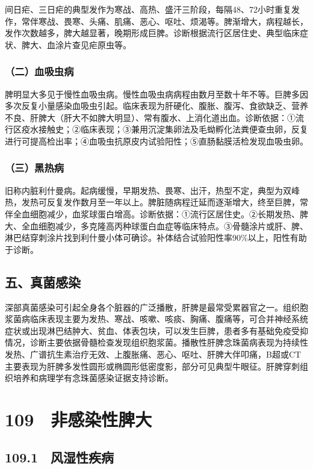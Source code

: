 间日疟、三日疟的典型发作为寒战、高热、盛汗三阶段，每隔48、72小时重复发作，常伴寒战、畏寒、头痛、肌痛、恶心、呕吐、烦渴等。脾渐增大，病程越长，发作次数越多，脾大越显著，晚期形成巨脾。诊断根据流行区居住史、典型临床症状、脾大、血涂片查见疟原虫等。

\subsubsection{（二）血吸虫病}

脾明显大多见于慢性血吸虫病。慢性血吸虫病病程由数月至数十年不等。巨脾多因多次反复小量感染血吸虫引起。临床表现为肝硬化、腹胀、腹泻、食欲缺乏、营养不良、肝脾大（肝大不如脾大明显）、常有腹水、上消化道出血。诊断依据：①流行区疫水接触史；②临床表现；③兼用沉淀集卵法及毛蚴孵化法粪便查虫卵，反复进行可提高检出率；④血吸虫抗原皮内试验阳性；⑤直肠黏膜活检发现血吸虫卵。

\subsubsection{（三）黑热病}

旧称内脏利什曼病。起病缓慢，早期发热、畏寒、出汗，热型不定，典型为双峰热，发热可反复发作数月至一年以上。脾脏随病程迁延而逐渐增大，终至巨脾，常伴全血细胞减少，血浆球蛋白增高。诊断依据：①流行区居住史。②长期发热、脾大、全血细胞减少，多克隆高丙种球蛋白血症等临床特点。③骨髓涂片或肝、脾、淋巴结穿刺涂片找到利什曼小体可确诊。补体结合试验阳性率90\%以上，阳性有助于诊断。

\subsection{五、真菌感染}

深部真菌感染可引起全身各个脏器的广泛播散，肝脾是最常受累器官之一。组织胞浆菌病临床表现主要为发热、寒战、咳嗽、咳痰、胸痛、腹痛等，可合并神经系统症状或出现淋巴结肿大、贫血、体表包块，可以发生巨脾，患者多有基础免疫受抑情况，诊断主要依据骨髓检查发现组织胞浆菌。播散性肝脾念珠菌病表现为持续性发热、广谱抗生素治疗无效、上腹胀痛、恶心、呕吐、肝脾大伴叩痛，B超或CT主要表现为肝脾多发性圆形或椭圆形低密度影，部分可见典型牛眼征。肝脾穿刺组织培养和病理学有念珠菌感染证据支持诊断。

\protect\hypertarget{text00246.html}{}{}

\section{109　非感染性脾大}

\subsection{109.1　风湿性疾病}


